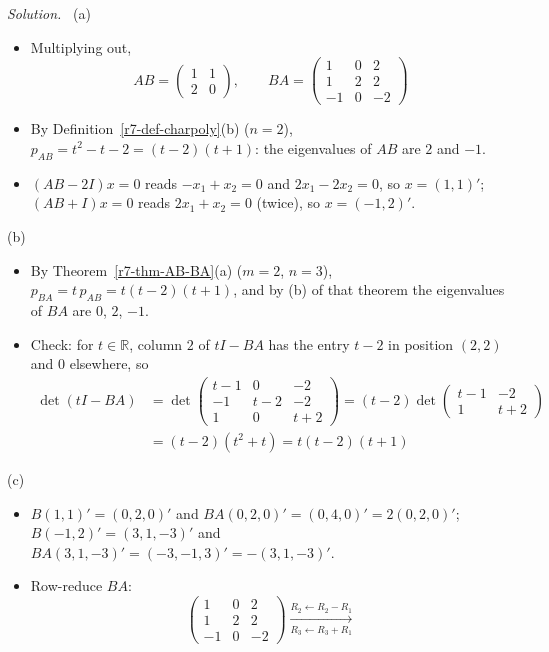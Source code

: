\documentclass[12pt]{article}
\newcommand{\R}{\mathbb R}
\theoremstyle{definition}
\newenvironment{solution}{\par\noindent\textit{Solution.}\ }{\par\smallskip}
\begin{document}
\begin{solution}
(a)
\begin{itemize}
\item Multiplying out,
\[
AB=\begin{pmatrix}1&1\\2&0\end{pmatrix},\qquad BA=\begin{pmatrix}1&0&2\\1&2&2\\-1&0&-2\end{pmatrix}
\]
\item By Definition~\ref{r7-def-charpoly}(b) (\(n=2\)), \(p_{AB}=t^2-t-2=(t-2)(t+1)\): the eigenvalues of \(AB\) are \(2\) and
\(-1\).
\item \((AB-2I)x=0\) reads \(-x_1+x_2=0\) and \(2x_1-2x_2=0\), so \(x=(1,1)'\); \((AB+I)x=0\) reads \(2x_1+x_2=0\) (twice), so
\(x=(-1,2)'\).
\end{itemize}
(b)
\begin{itemize}
\item By Theorem~\ref{r7-thm-AB-BA}(a) (\(m=2\), \(n=3\)), \(p_{BA}=t\,p_{AB}=t(t-2)(t+1)\), and by (b) of that theorem the
eigenvalues of \(BA\) are \(0\), \(2\), \(-1\).
\item Check: for \(t\in\R\), column \(2\) of \(tI-BA\) has the entry \(t-2\) in position \((2,2)\) and \(0\) elsewhere, so
\[
\begin{aligned}
\det(tI-BA)&=\det\begin{pmatrix}t-1&0&-2\\-1&t-2&-2\\1&0&t+2\end{pmatrix}=(t-2)\det\begin{pmatrix}t-1&-2\\1&t+2\end{pmatrix}\\
&=(t-2)(t^2+t)=t(t-2)(t+1)
\end{aligned}
\]
\end{itemize}
(c)
\begin{itemize}
\item \(B(1,1)'=(0,2,0)'\) and \(BA(0,2,0)'=(0,4,0)'=2(0,2,0)'\); \(B(-1,2)'=(3,1,-3)'\) and
\(BA(3,1,-3)'=(-3,-1,3)'=-(3,1,-3)'\).
\item Row-reduce \(BA\):
\[
\begin{pmatrix}1&0&2\\1&2&2\\-1&0&-2\end{pmatrix}
\xrightarrow[R_3\leftarrow R_3+R_1]{R_2\leftarrow R_2-R_1}
\]
\end{itemize}
\end{solution}
\end{document}

